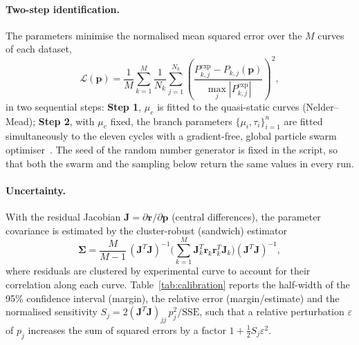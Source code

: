 \documentclass[11pt,a4paper]{article}
\begin{document}
\paragraph{Two-step identification.}
The parameters minimise the normalised mean squared error over the $M$ curves of each dataset,
\begin{equation}
  \mathcal{L}(\bm{p}) = \frac{1}{M}\sum_{k=1}^{M}\frac{1}{N_k}\sum_{j=1}^{N_k}
  \left(\frac{P^{\mathrm{exp}}_{k,j}-P_{k,j}(\bm{p})}{\max_j |P^{\mathrm{exp}}_{k,j}|}\right)^2,
\end{equation}
in two sequential steps:
\textbf{Step 1}, $\mu_e$ is fitted to the quasi-static curves (Nelder--Mead);
\textbf{Step 2}, with $\mu_e$ fixed, the branch parameters $\{\mu_i,\tau_i\}_{i=1}^{n}$ are fitted simultaneously to the eleven cycles with a gradient-free, global particle swarm optimiser~\cite{Optim}. The seed of the random number generator is fixed in the script, so that both the swarm and the sampling below return the same values in every run.

\paragraph{Uncertainty.}
With the residual Jacobian $\bm{J}=\partial\bm{r}/\partial\bm{p}$ (central differences), the parameter covariance is estimated by the cluster-robust (sandwich) estimator~\cite{Cameron2015}
\begin{equation}
  \bm{\Sigma} = \frac{M}{M-1}\,(\bm{J}^{T}\bm{J})^{-1}\Big(\sum_{k=1}^{M}\bm{J}_k^{T}\bm{r}_k\bm{r}_k^{T}\bm{J}_k\Big)(\bm{J}^{T}\bm{J})^{-1},
\end{equation}
where residuals are clustered by experimental curve to account for their correlation along each curve.
Table~\ref{tab:calibration} reports the half-width of the 95\% confidence interval (margin), the relative error (margin/estimate) and the normalised sensitivity $S_j=2(\bm{J}^T\bm{J})_{jj}\,p_j^2/\mathrm{SSE}$, such that a relative perturbation $\varepsilon$ of $p_j$ increases the sum of squared errors by a factor $1+\tfrac12 S_j\varepsilon^2$.
\end{document}
